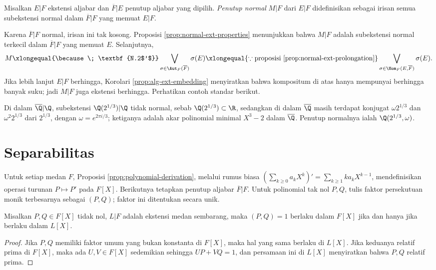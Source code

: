 \begin{definition}\label{def:normal-closure}
	Misalkan $E|F$ ekstensi aljabar dan $\overline{F}|E$ penutup aljabar yang dipilih. \emph{Penutup normal} $M|F$ dari $E|F$ didefinisikan sebagai irisan semua subekstensi normal dalam $\overline{F}|F$ yang memuat $E|F$.
\end{definition}
Karena $\overline{F}|F$ normal, irisan ini tak kosong. Proposisi \ref{prop:normal-ext-properties} menunjukkan bahwa $M|F$ adalah subekstensi normal terkecil dalam $\overline{F}|F$ yang memuat $E$. Selanjutnya,
\[ M \xlongequal{\because\; \textbf{N.2$'$}} \bigvee_{\sigma \in \Aut_F(\overline{F})} \sigma(E) \xlongequal{\because \text{proposisi \ref{prop:normal-ext-prolongation}}} \bigvee_{\sigma \in \Hom_F(E, \overline{F})} \sigma(E). \]
Jika lebih lanjut $E|F$ berhingga, Korolari \ref{prop:alg-ext-embedding} menyiratkan bahwa kompositum di atas hanya mempunyai berhingga banyak suku; jadi $M|F$ juga ekstensi berhingga. Perhatikan contoh standar berikut.

\begin{example}\label{eg:x3-2-splitting}
	Di dalam $\overline{\Q}|\Q$, subekstensi $\Q(2^{1/3})|\Q$ tidak normal, sebab $\Q(2^{1/3}) \subset \R$, sedangkan di dalam $\overline{\Q}$ masih terdapat konjugat $\omega 2^{1/3}$ dan $\omega^2 2^{1/3}$ dari $2^{1/3}$, dengan $\omega = e^{2\pi i/3}$; ketiganya adalah akar polinomial minimal $X^3 - 2$ dalam $\overline{\Q}$. Penutup normalnya ialah $\Q(2^{1/3},\omega)$.
\end{example}

\section{Separabilitas}
Untuk setiap medan $F$, Proposisi \ref{prop:polynomial-derivation}, melalui rumus biasa $(\sum_{k \geq 0} a_k X^k)' = \sum_{k \geq 1} ka_k X^{k-1}$, mendefinisikan operasi turunan $P \mapsto P'$ pada $F[X]$. Berikutnya tetapkan penutup aljabar $\overline{F}|F$. Untuk polinomial tak nol $P, Q$, tulis faktor persekutuan monik terbesarnya sebagai $(P, Q)$; faktor ini ditentukan secara unik.

\begin{lemma}\label{prop:coprime-basechange}
	Misalkan $P,Q \in F[X]$ tidak nol, $L|F$ adalah ekstensi medan sembarang, maka $(P,Q)=1$ berlaku dalam $F[X]$ jika dan hanya jika berlaku dalam $L[X]$.
\end{lemma}
\begin{proof}
	Jika $P,Q$ memiliki faktor umum yang bukan konstanta di $F[X]$, maka hal yang sama berlaku di $L[X]$. Jika keduanya relatif prima di $F[X]$, maka ada $U,V \in F[X]$ sedemikian sehingga $UP+VQ=1$, dan persamaan ini di $L[X]$ menyiratkan bahwa $P,Q$ relatif prima.
\end{proof}

